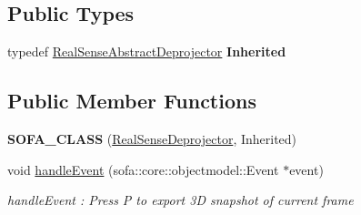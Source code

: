 \subsection*{Public Types}
\begin{DoxyCompactItemize}
\item 
\mbox{\label{classsofa_1_1rgbdtracking_1_1_real_sense_deprojector_a6bae03808ffd8dcb3a90e7ed450cac45}} 
typedef \hyperlink{classsofa_1_1rgbdtracking_1_1_real_sense_abstract_deprojector}{Real\+Sense\+Abstract\+Deprojector} {\bfseries Inherited}
\end{DoxyCompactItemize}
\subsection*{Public Member Functions}
\begin{DoxyCompactItemize}
\item 
\mbox{\label{classsofa_1_1rgbdtracking_1_1_real_sense_deprojector_ab83880605bbf09764e64573381b5502c}} 
{\bfseries S\+O\+F\+A\+\_\+\+C\+L\+A\+SS} (\hyperlink{classsofa_1_1rgbdtracking_1_1_real_sense_deprojector}{Real\+Sense\+Deprojector}, Inherited)
\item 
void \hyperlink{classsofa_1_1rgbdtracking_1_1_real_sense_deprojector_aaa5648b58d79dcabc8265d7eec19b78a}{handle\+Event} (sofa\+::core\+::objectmodel\+::\+Event $\ast$event)
\begin{DoxyCompactList}\small\item\em handle\+Event \+: Press P to export 3D snapshot of current frame \end{DoxyCompactList}\end{DoxyCompactItemize}
